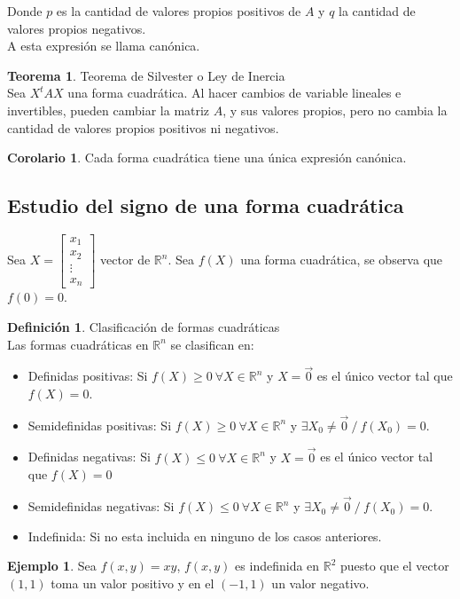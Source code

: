\documentclass[10pt]{article}
\theoremstyle{definition}
\newtheorem{definition}{Definición}[section]
\newtheorem{theorem}{Teorema}[section]
\newtheorem{corollary}{Corolario}[theorem]
\newtheorem{example}{Ejemplo}[section]
\begin{document}
Donde $p$ es la cantidad de valores propios positivos de $A$ y $q$ la cantidad de valores propios negativos.\\
A esta expresión se llama canónica.
\begin{theorem}{Teorema de Silvester o Ley de Inercia}
    \\Sea $X^tAX$ una forma cuadrática. Al hacer cambios de variable lineales e invertibles, pueden cambiar la matriz $A$, y sus valores propios, pero no cambia la cantidad de valores propios positivos ni negativos.
\end{theorem}
\begin{corollary}
    Cada forma cuadrática tiene una única expresión canónica.
\end{corollary}\newpage
\subsection{Estudio del signo de una forma cuadrática}
Sea $X=\begin{bmatrix}x_{1}\\x_{2}\\\vdots \\x_{n}\end{bmatrix}$ vector de $\mathbb{R}^n$. Sea $f(X)$ una forma cuadrática, se observa que $f(0)=0$.
\begin{definition}{Clasificación de formas cuadráticas}
    \\Las formas cuadráticas en $\mathbb{R}^n$ se clasifican en: 
    \begin{itemize}
        \item Definidas positivas: Si $f(X)\ge0\ \forall X\in\mathbb{R}^n$ y $X=\vec{0}$ es el único vector tal que $f(X)=0$.
        \item Semidefinidas positivas: Si $f(X)\ge0\ \forall X\in\mathbb{R}^n$ y $\exists X_0\neq\vec{0}\ /\ f(X_0)=0$.
        \item Definidas negativas: Si $f(X)\le0\ \forall X\in\mathbb{R}^n$ y $X=\vec{0}$ es el único vector tal que $f(X)=0$
        \item Semidefinidas negativas: Si $f(X)\le0\ \forall X\in\mathbb{R}^n$ y $\exists X_0\neq\vec{0}\ /\ f(X_0)=0$.
        \item Indefinida: Si no esta incluida en ninguno de los casos anteriores.
    \end{itemize}
\end{definition}
\begin{example}
    Sea $f(x,y)=xy$, $f(x,y)$ es indefinida en $\mathbb{R}^2$ puesto que el vector $(1,1)$ toma un valor positivo y en el $(-1,1)$ un valor negativo.
\end{example}
\end{document}

